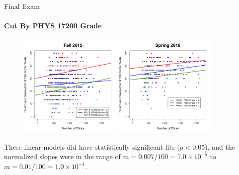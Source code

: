 \documentclass[xcolor=x11names,compress]{beamer}
\begin{document}
\begin{frame}{Final Exam}
	\framesubtitle{Cut By PHYS 17200 Grade}
	\begin{figure}
		\includegraphics[width=0.44\textwidth]{img/final_fa15_172.pdf}
		\includegraphics[width=0.44\textwidth]{img/final_sp16_172.pdf}
	\end{figure}
	These linear models did have statistically significant fits ($ p < 0.05$), and the normalized slopes were in the range of $m = 0.007 / 100 = 7.0 \times 10^{-5}$ to $m = 0.01 / 100 = 1.0 \times 10^{-4}$.
\end{frame}

\end{document}
